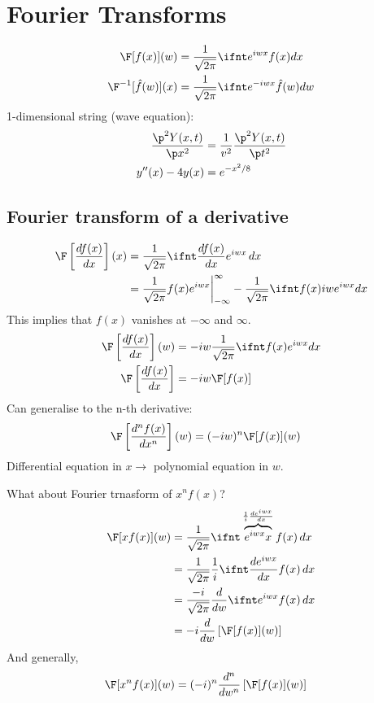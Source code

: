 \documentclass[cplx.tex]{subfiles}
\begin{document}
\section{Fourier Transforms}
\begin{align}
    \F[f(x)](w) &= \frac{1}{\sqrt{2\pi}} \ifnt e^{iwx}f(x)dx \\
    \F^{-1}[\hat{f}(w)](x) &= \frac{1}{\sqrt{2\pi}} \ifnt e^{-iwx}\hat{f}(w)dw
\end{align}
1-dimensional string (wave equation):
\begin{align}
    \frac{\p^2Y(x,t)}{\p x^2} &= \frac{1}{v^2}\frac{\p^2Y(x,t)}{\p t^2} \\
    y''(x) - 4y(x) &= e^{-x^2/8}
\end{align}

\subsection{Fourier transform of a derivative}
\begin{align}
    \F\left[\frac{df(x)}{dx}\right](x) &= \frac{1}{\sqrt{2\pi}} \ifnt \frac{df(x)}{dx} e^{iwx}\,dx \\
                                       &= \frac{1}{\sqrt{2\pi}} f(x)e^{iwx}\bigg|_{-\infty}^{\infty} - \frac{1}{\sqrt{2\pi}} \ifnt f(x)iwe^{iwx}dx 
\end{align}
This implies that $f(x)$ vanishes at $-\infty$ and $\infty$.
\begin{align}
    \F\left[\frac{df(x)}{dx}\right](w) &= -iw\frac{1}{\sqrt{2\pi}} \ifnt f(x)e^{iwx}dx \\ 
    \F\left[\frac{df(x)}{dx}\right] &= -iw\F[f(x)]
\end{align}
Can generalise to the n-th derivative:
\begin{align}
    \F\left[\frac{d^nf(x)}{dx^n}\right](w) &= (-iw)^n\F[f(x)](w)
\end{align}
Differential equation in $x \to$ polynomial equation in $w$.

What about Fourier trnasform of $x^nf(x)$?
\begin{align}
    \F[xf(x)](w) &= \frac{1}{\sqrt{2\pi}} \ifnt \overbrace{e^{iwx}x}^{\frac{1}{i}\frac{de^{iwx}}{dx}}f(x)\,dx \\
                 &= \frac{1}{\sqrt{2\pi}} \frac{1}{i} \ifnt \frac{de^{iwx}}{dx}f(x)\,dx \\
                 &= \frac{-i}{\sqrt{2\pi}} \frac{d}{dw} \ifnt e^{iwx}f(x)\,dx \\
                 &= -i\frac{d}{dw} \left[\F[f(x)](w)\right]
\end{align}
And generally, 
\begin{align}
    \F[x^nf(x)](w) &= (-i)^n\frac{d^n}{dw^n} \left[\F[f(x)](w)\right]
\end{align}
\end{document}
